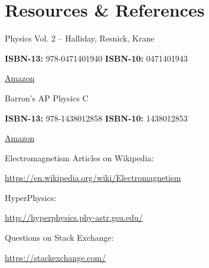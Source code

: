 \chapter{Resources \& References}

Physics Vol. 2 -- Halliday, Resnick, Krane

\textbf{ISBN-13:} 978-0471401940 \textbf{ISBN-10:} 0471401943

\href{https://www.amazon.com/Physics-2-David-Halliday/dp/0471401943/}{Amazon}

\bigskip

Barron's AP Physics C 

\textbf{ISBN-13:} 978-1438012858 \textbf{ISBN-10:} 1438012853

\href{https://www.amazon.com/AP-Physics-Practice-Tests-Barrons/dp/1438012853/}{Amazon}

\bigskip

Electromagnetism Articles on Wikipedia:

\href{https://en.wikipedia.org/wiki/Electromagnetism}{https://en.wikipedia.org/wiki/Electromagnetism}

\bigskip

HyperPhysics:

\href{http://hyperphysics.phy-astr.gsu.edu/}{http://hyperphysics.phy-astr.gsu.edu/}

\bigskip

Questions on Stack Exchange:

\href{https://stackexchange.com/}{https://stackexchange.com/}